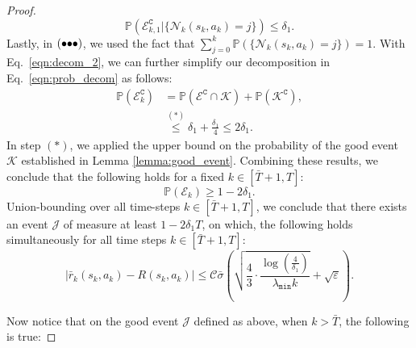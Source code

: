 \documentclass{article}
\newcommand{\mc}{\mathcal}
\begin{document}
\begin{proof}
\begin{equation}\label{eqn:semibound}
    \mathbb{P}\left( \mathcal{E}_{k,1}^{\texttt{C}} \lvert \{\mathcal{N}_k(s_k, a_k) = j\} \right) \leq \delta_1.
\end{equation}
Lastly, in $(\bullet\hspace{-0.8mm}\bullet\hspace{-0.8mm}\bullet)$, we used the fact that $\sum_{j = 0}^{k} \mathbb{P}\left(\{\mathcal{N}_k(s_k,a_k)=j\}\right) =1.$ 
With Eq.~\eqref{eqn:decom_2}, we can further simplify our decomposition in Eq.~\eqref{eqn:prob_decom} as follows:
\begin{equation}
    \begin{aligned}
        \mathbb{P}(\mathcal{E}_k^{\texttt{C}}) &= \mathbb{P}(\mathcal{E}^{\texttt{C}} \cap \mathcal{K}) + \mathbb{P}(\mathcal{K}^{\texttt{C}}),\\ 
    &\overset{(*)}{\leq} \delta_1 +\frac{\delta_1}{4} \le 2 \delta_1.
   \end{aligned}
\end{equation}
In step \((*)\), we applied the upper bound on the probability of the good event \(\mc{K}\) established in Lemma \ref{lemma:good_event}. Combining these results, we conclude that the following holds for a fixed $k \in [\bar{T}+1, T]$:
\begin{equation}
    \mathbb{P}(\mc{E}_k) \geq 1 - 2\delta_1.
\end{equation}
Union-bounding over all time-steps \(k \in [\bar{T}+1, T]\), we conclude that there exists an event \(\mathcal{J}\) of measure at least $1- 2\delta_1 T$, on which, the following holds 
simultaneously for all time steps \(k \in [\bar{T}+1, T]\): 
\begin{equation}\label{eqn:high-prob_async_q}
        \left| \bar{r}_k(s_k, a_k) - R(s_k, a_k) \right| 
        \leq \mc{C} \bar{\sigma} \left( 
            \sqrt{ \frac{4}{3} \cdot \frac{ \log\left( \frac{4}{\delta_1} \right) }{ \lambda_{\texttt{min}} k } } 
            + \sqrt{\varepsilon} 
        \right). 
\end{equation}

Now notice that on the good event $\mc{J}$ defined as above, when $k > \bar{T}$, the following is true:


\end{proof}
\end{document}
